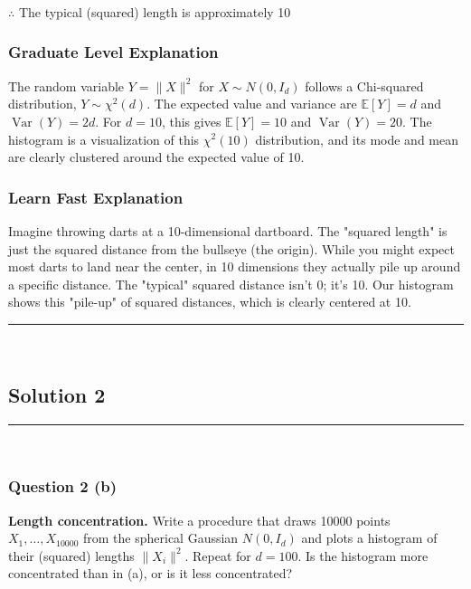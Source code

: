 \documentclass{article}
\begin{document}
\subsubsection*{\normalfont}{$\therefore$ The typical (squared) length is approximately 10}

\subsubsection*{Graduate Level Explanation}
The random variable $Y = \|X\|^2$ for $X \sim N(0, I_d)$ follows a Chi-squared distribution, $Y \sim \chi^2(d)$. The expected value and variance are $\mathbb{E}[Y] = d$ and $\operatorname{Var}(Y) = 2d$. For $d=10$, this gives $\mathbb{E}[Y] = 10$ and $\operatorname{Var}(Y) = 20$. The histogram is a visualization of this $\chi^2(10)$ distribution, and its mode and mean are clearly clustered around the expected value of 10.

\subsubsection*{Learn Fast Explanation}
Imagine throwing darts at a 10-dimensional dartboard. The "squared length" is just the squared distance from the bullseye (the origin). While you might expect most darts to land near the center, in 10 dimensions they actually pile up around a specific distance. The "typical" squared distance isn't 0; it's 10. Our histogram shows this "pile-up" of squared distances, which is clearly centered at 10.

\noindent\rule{\textwidth}{0.4pt}\\

\newpage

\subsection*{Solution 2}
\noindent\rule{\textwidth}{0.4pt}\\
\subsubsection*{Question 2 (b)}
\begin{flushleft}
    \textbf{Length concentration.} Write a procedure that draws 10000 points $X_1, \ldots, X_{10000}$ from the spherical Gaussian $N(0, I_d)$ and plots a histogram of their (squared) lengths $\|X_i\|^2$. 
    Repeat for $d=100$. Is the histogram more concentrated than in (a), or is it less concentrated? 
\end{flushleft}
\end{document}
